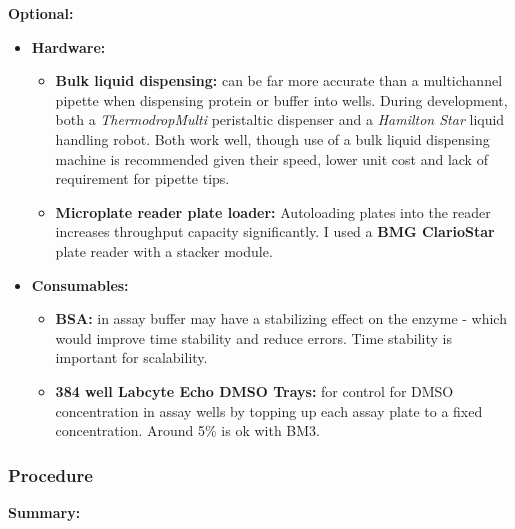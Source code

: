 \documentclass[16pt]{book}
\begin{document}
\textbf{Optional:}
\begin{itemize}
	\item \textbf{Hardware:}
		\begin{itemize}
			\item \textbf{Bulk liquid dispensing:} can be far more accurate than a multichannel pipette when dispensing protein or buffer into wells.
			During development, both a \textit{ThermodropMulti} peristaltic dispenser and a \textit{Hamilton Star} liquid handling robot. 
			Both work well, though use of a bulk liquid dispensing machine is recommended given their speed, lower unit cost and lack of requirement for pipette tips.
			\item \textbf{Microplate reader plate loader:} Autoloading plates into the reader increases throughput capacity significantly.
			I used a \textbf{BMG ClarioStar} plate reader with a stacker module.
		\end{itemize}
	\item \textbf{Consumables:}
		\begin{itemize}
			\item \textbf{BSA:} in assay buffer may have a stabilizing effect on the enzyme - which would improve time stability and reduce errors.
			Time stability is important for scalability.
			\item \textbf{384 well Labcyte Echo DMSO Trays:} for control for DMSO concentration in assay wells by topping up each assay plate to a fixed concentration. 
			Around 5\% is ok with BM3.
		\end{itemize}
\end{itemize}

\subsubsection{Procedure}


\textbf{Summary:}
\end{document}

